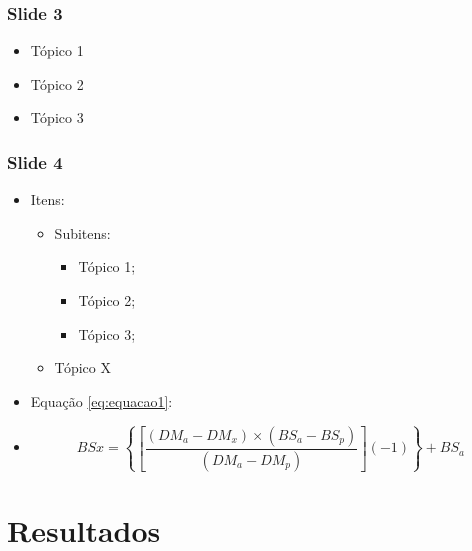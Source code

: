 \documentclass{beamer}
\begin{document}
\begin{frame}
    \frametitle{Slide 3}
    
     \begin{itemize}[<+->]
        \item Tópico 1
        \item Tópico 2
        \item Tópico 3
    \end{itemize}    
\end{frame}


\begin{frame}
    \frametitle{Slide 4}
        
     \begin{itemize}[<+->]
        \item Itens:
        \begin{itemize}
            \item Subitens:
            \begin{itemize}[<+->]
                \item Tópico 1; 
                \item Tópico 2;
                \item Tópico 3;
            \end{itemize} 
            \item Tópico X
        \end{itemize}
        \item Equação \ref{eq:equacao1}:
        \item[] \begin{equation} \label{eq:equacao1}
BSx =  \left\{ \left[ \dfrac{( DM_a - DM_x ) \times ( BS_a - BS_p )}{( DM_a - DM_p )} \right] (-1) \right\} + BS_a
\end{equation}
    \end{itemize}    
\end{frame} 


\section{Resultados}
\end{document}
